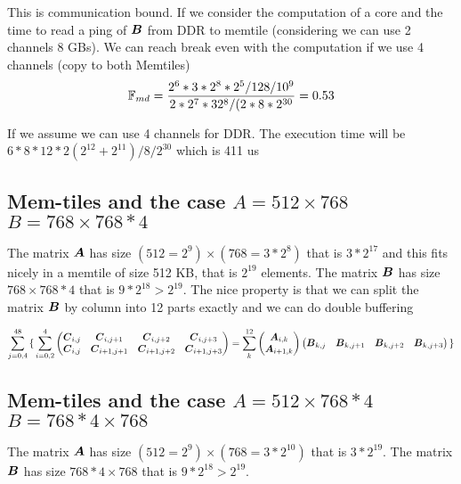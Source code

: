 \documentclass[conference]{IEEEtran}
\begin{document}
This is communication bound. If we consider the computation of a core
and the time to read a ping of ${\boldsymbol B}$ from DDR to memtile
(considering we can use 2 channels 8 GBs). We can reach break even
with the computation if we use 4 channels (copy to both
Memtiles)
\[
\mathbb{F}_{md} = \frac{2^6 * 3*2^8 * 2^5 /128/10^9  } {2*2^7*32^8/(2*8*2^{30}} = 0.53
\]

If we assume we can use 4 channels for DDR. The execution time will be
$6*8*12*{2(2^{12}+2^{11})/8/2^{30}}$ which is 411 us




\subsection{Mem-tiles and the case   $A=512\times 768$ $B=768\times 768*4$ }
The matrix ${\boldsymbol A}$ has size $(512=2^9) \times (768= 3*2^8)$ that is
$3*2^{17}$ and this fits nicely in a memtile of size 512 KB, that is
$2^{19}$ elements.  The matrix ${\boldsymbol B}$ has size $768 \times 768*4$
that is $9*2^{18}>2^{19}$. The nice property is that we can split the
matrix ${\boldsymbol B}$ by column into 12 parts exactly and we can do double
buffering 

{\small \begin{equation*}
    \sum_{j=0,4}^{48}
    { \{} \sum_{i=0,2}^4
  \begin{pmatrix}
    {\boldsymbol C}_{i,j}  & {\boldsymbol C}_{i,j+1}    & {\boldsymbol C}_{i,j+2}    &{\boldsymbol C}_{i,j+3} \\
    {\boldsymbol C}_{i,j}  & {\boldsymbol C}_{i+1,j+1}   & {\boldsymbol C}_{i+1,j+2}  & {\boldsymbol C}_{i+1,j+3} \\
  \end{pmatrix}    = \sum_k^{12}
  \begin{pmatrix}
    {\boldsymbol A}_{i,k}  \\
    {\boldsymbol A}_{i+1,k}   \\
  \end{pmatrix}  
  \begin{pmatrix}
    {\boldsymbol B}_{k,j}  &  {\boldsymbol B}_{k,j+1}  & {\boldsymbol B}_{k,j+2}  &{\boldsymbol B}_{k,j+3} \\
  \end{pmatrix}
  { \}}    
\end{equation*}
}


\subsection{Mem-tiles and the case $A=512\times 768*4$ $B=768*4 \times 768$ }
The matrix ${\boldsymbol A}$ has size $(512=2^9) \times (768= 3*2^{10})$ that
is $3*2^{19}$.  The matrix ${\boldsymbol B}$ has size $768*4 \times 768$ that
is $9*2^{18}>2^{19}$.
\end{document}
